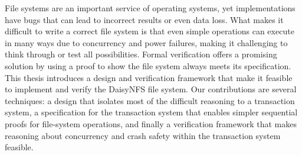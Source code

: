 File systems are an important service of operating systems, yet implementations
have bugs that can lead to incorrect results or even data loss. What makes it
difficult to write a correct file system is that even simple operations can
execute in many ways due to concurrency and power failures, making it
challenging to think through or test all possibilities. Formal verification
offers a promising solution by using a proof to show the file system always
meets its specification. This thesis introduces a design and verification
framework that make it feasible to implement and verify the DaisyNFS file
system. Our contributions are several techniques: a design that isolates most of
the difficult reasoning to a transaction system, a specification for the
transaction system that enables simpler sequential proofs for file-system
operations, and finally a verification framework that makes reasoning about
concurrency and crash safety within the transaction system feasible.

%
